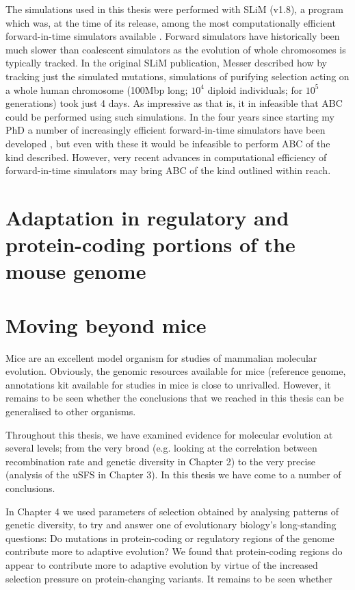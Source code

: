 The simulations used in this thesis were performed with SLiM (v1.8), a program which was, at the time of its release, among the most computationally efficient forward-in-time simulators available \cite{RN148}. Forward simulators have historically been much slower than coalescent simulators as the evolution of whole chromosomes is typically tracked. In the original SLiM publication, Messer described how by tracking just the simulated mutations, simulations of purifying selection acting on a whole human chromosome (100Mbp long; $10^4$ diploid individuals; for $10^5$ generations) took just 4 days. As impressive as that is, it in infeasible that ABC could be performed using such simulations. In the four years since starting my PhD a number of increasingly efficient forward-in-time simulators have been developed \citep{RN362, RN360, RN361}, but even with these it would be infeasible to perform ABC of the kind described. However, very recent advances in computational efficiency of forward-in-time simulators \citep{RN359} may bring ABC of the kind outlined within reach.

\section{Adaptation in regulatory and protein-coding portions of the mouse genome}



\section{Moving beyond mice}

Mice are an excellent model organism for studies of mammalian molecular evolution. Obviously, the genomic resources available for mice (reference genome, annotations  kit available for studies in mice is close to unrivalled. 
However, it remains to be seen whether the conclusions that we reached in this thesis can be generalised to other organisms. 
 
Throughout this thesis, we have examined evidence for molecular evolution at several levels; from the very broad (e.g. looking at the correlation between recombination rate and genetic diversity in Chapter 2) to the very precise (analysis of the uSFS in Chapter 3). In this thesis we have come to a number of conclusions. 

In Chapter 4 we used parameters of selection obtained by analysing patterns of genetic diversity, to try and answer one of evolutionary biology's long-standing questions: Do mutations in protein-coding or regulatory regions of the genome contribute more to adaptive evolution? We found that protein-coding regions do appear to contribute more to adaptive evolution by virtue of the increased selection pressure on protein-changing variants. It remains to be seen whether 

